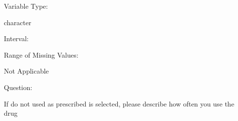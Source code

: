 \documentclass[
]{article}
\begin{document}
\begin{minipage}[t]{0.3\linewidth}

Variable Type:

\end{minipage}%
\begin{minipage}[t]{0.7\linewidth}

character

\end{minipage}

\begin{minipage}[t]{0.3\linewidth}

Interval:

\end{minipage}%
\begin{minipage}[t]{0.7\linewidth}

\end{minipage}

\begin{minipage}[t]{0.3\linewidth}

Range of Missing Values:

\end{minipage}%
\begin{minipage}[t]{0.7\linewidth}

Not Applicable

\end{minipage}

\begin{minipage}[t]{0.3\linewidth}

Question:

\end{minipage}%
\begin{minipage}[t]{0.7\linewidth}

If do not used as prescribed is selected, please describe how often you
use the drug

\end{minipage}
\end{document}
